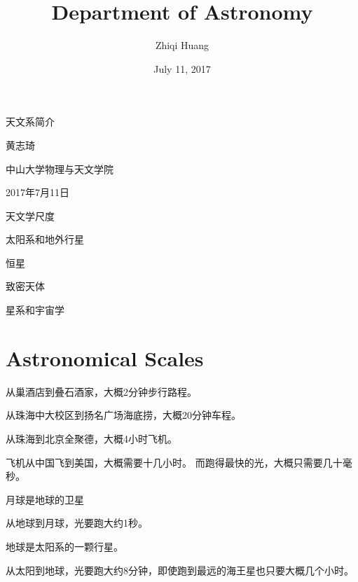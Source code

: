 \documentclass[CJK]{beamer}
\title{Department of Astronomy}
\author{Zhiqi Huang}
\institute{Sun Yat-sen University}
\date{July 11, 2017}
\begin{document}
\begin{frame}
  \bch
  \bcenter
      {\Huge 天文系简介}


      {\large 黄志琦}

      中山大学物理与天文学院 
      
      2017年7月11日

      
      \ecenter
      \ech
\end{frame}



\begin{frame}
\centering
\bch
\bitem
\item{天文学尺度}
\item{太阳系和地外行星}
\item{恒星}
\item{致密天体}
\item{星系和宇宙学} 
  \eitem
  \ech
\end{frame}

\section{Astronomical Scales}




\begin{frame}
  \bch
  \bitem
\item{从巢酒店到叠石酒家，大概2分钟步行路程。}
\item{从珠海中大校区到扬名广场海底捞，大概20分钟车程。}
\item{从珠海到北京全聚德，大概4小时飞机。}
  \eitem

  
  \ech
\end{frame}

\begin{frame}
  \bch
  飞机从中国飞到美国，大概需要十几小时。
  而跑得最快的光，大概只需要几十毫秒。
  \ech
\end{frame}


\begin{frame}
  \bch
  月球是地球的卫星
  
 \bcenter 
  从地球到月球，光要跑大约1秒。
  \ecenter
  \ech
\end{frame}


\begin{frame}
  \bch
  地球是太阳系的一颗行星。
  
 \bcenter 
 从太阳到地球，光要跑大约8分钟，即使跑到最远的海王星也只要大概几个小时。
  \ecenter
  \ech
\end{frame}
\end{document}
